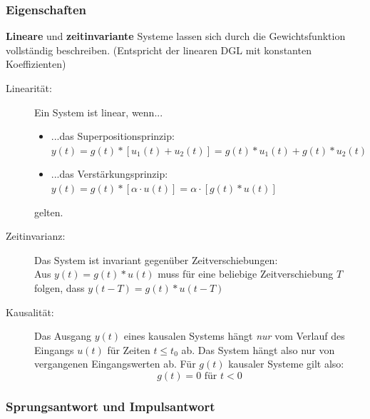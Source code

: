 \documentclass[12pt,a4paper,ngerman]{scrartcl}
\begin{document}
\subsubsection{Eigenschaften}
\textbf{Lineare} und \textbf{zeitinvariante} Systeme lassen sich durch die Gewichtsfunktion vollständig beschreiben. (Entspricht der linearen DGL mit konstanten Koeffizienten)
\begin{description}
\item[Linearität:] Ein System ist linear, wenn...
  \begin{itemize}
  \item ...das Superpositionsprinzip: $y(t)=g(t)*[u_1(t)+u_2(t)]=g(t)*u_1(t)+ g(t)*u_2(t)$
  \item ...das Verstärkungsprinzip: $y(t)=g(t)*[\alpha \cdot u(t)]= \alpha \cdot[g(t)*u(t)]$
  \end{itemize}
gelten.
\item[Zeitinvarianz:] Das System ist invariant gegenüber Zeitverschiebungen: \\
Aus $y(t)=g(t)*u(t)$ muss für eine beliebige Zeitverschiebung $T$ folgen, dass $y(t-T)=g(t)*u(t-T)$
\item[Kausalität:] Das Ausgang $y(t)$ eines kausalen Systems hängt \emph{nur} vom Verlauf des Eingangs $u(t)$ für Zeiten $t\le t_0$ ab. Das System hängt also nur von vergangenen Eingangswerten ab. Für $g(t)$ kausaler Systeme gilt also:
  \begin{equation*}
    g(t)=0 \text{ für } t<0
  \end{equation*}
\end{description}

\subsubsection{Sprungsantwort und Impulsantwort}
\end{document}
